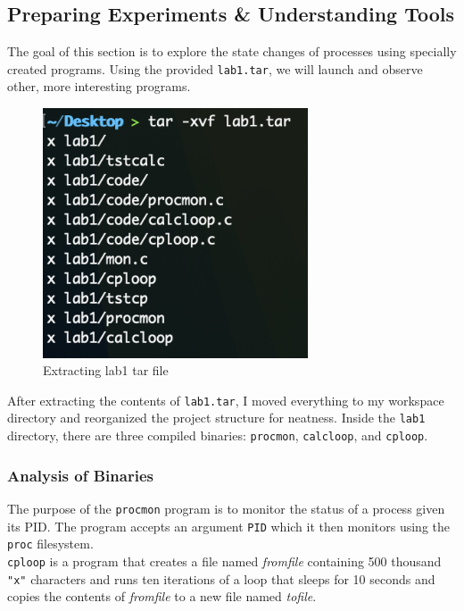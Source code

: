 \subsection{Preparing Experiments \& Understanding Tools}\label{subsec:preparing-experiments-&-understanding-tools}
The goal of this section is to explore the state changes of processes using specially created programs.
Using the provided \texttt{lab1.tar}, we will launch and observe other, more interesting programs.
\begin{figure}[H]
    \centering
    \includegraphics[width=0.7\textwidth]{../../screenshots/step6-tar}
    \caption{Extracting lab1 tar file}
    \label{fig:step6-extract-tar}
\end{figure}

\afterfloat
After extracting the contents of \texttt{lab1.tar},
I moved everything to my workspace directory and reorganized the
project structure for neatness.
Inside the \texttt{lab1} directory, there are three compiled binaries:
\texttt{procmon}, \texttt{calcloop}, and \texttt{cploop}.
\subsubsection{Analysis of Binaries}
\noindent
The purpose of the \texttt{procmon} program is to monitor the
status of a process given its PID\@.
The program accepts an argument \texttt{PID} which it then monitors
using the \texttt{proc} filesystem.\\

\noindent
\texttt{cploop} is a program that creates a file named \textit{fromfile}
containing 500 thousand \texttt{"x"} characters and runs ten iterations of a loop that
sleeps for 10 seconds and copies the contents of \textit{fromfile} to a new
file named \textit{tofile}.\\

